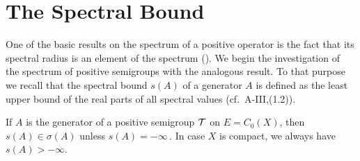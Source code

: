 \section{The Spectral Bound}\label{sec:b3-1}%
One of the basic results on the spectrum of a positive operator is the fact that its spectral radius is an element of the spectrum (\citet[V.Proposition~4.1]{schaefer:1974}).
We begin the investigation of the spectrum of positive semigroups with the analogous result.
To that purpose we recall that the spectral bound $s(A)$ of a generator $A$ is defined as the least upper bound of the real parts of all spectral values (cf.\ A-III,(1.2)).
\pagebreak[1]
%
\begin{theorem}\label{thm:b3-1.1}
If $A$ is the generator of a positive semigroup $\mathcal{T}$ on $E = C_{0}(X)$, then $s(A) \in \sigma(A)$ unless 
$s(A) = -\infty$\,.
In case $X$ is compact, we always have $s(A) > -\infty$.
\end{theorem}
